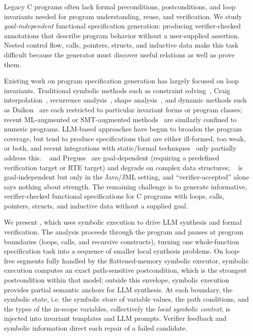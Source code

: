 

Legacy C programs often lack formal preconditions, postconditions, and loop invariants needed for program understanding, reuse, and verification. We study \emph{goal-independent} functional specification generation: producing verifier-checked annotations that describe program behavior without a user-supplied assertion. Nested control flow, calls, pointers, structs, and inductive data make this task difficult because the generator must discover useful relations as well as prove them.

Existing work on program specification generation has largely focused on loop invariants. Traditional symbolic methods such as constraint solving~\cite{DBLP:conf/cav/ColonSS03,DBLP:journals/pacmpl/LiuFYSL22}, Craig interpolation~\cite{FiB_Squeezing_loop,DBLP:conf/cade/GanDXZKC16,Nonlinear_Craig_Interpolant_Generation}, recurrence analysis~\cite{beyer2024decomposing,wonisch2012predicate}, shape analysis~\cite{calcagno2009compositional}, and dynamic methods such as Daikon~\cite{Daikon} are each restricted to particular invariant forms or program classes; recent ML-augmented or SMT-augmented methods~\cite{Code2Inv_a_Deep_Learning_Framework_for_Program_Verification,Loop_Invariant_Inference_through_SMT_Solving_Enhanced_Reinforcement_Learning,DBLP:journals/pacmse/CaoWXYWCM25} are similarly confined to numeric programs. LLM-based approaches have begun to broaden the program coverage, but tend to produce specifications that are either ill-formed, too weak, or both, and recent integrations with static/formal techniques~\cite{autospec,Enhancing_Automated_Loop_Invariant_Generation_for_Complex_Programs_with_Large_Language_Models,SpecGen,Wang2025ATO} only partially address this. \autospec~\cite{autospec} and Preguss~\cite{Wang2025ATO} are goal-dependent (requiring a predefined verification target or RTE target) and degrade on complex data structures; \specgen~\cite{SpecGen} is goal-independent but only in the Java/JML setting, and ``verifier-accepted'' alone says nothing about strength. The remaining challenge is to generate informative, verifier-checked functional specifications for C programs with loops, calls, pointers, structs, and inductive data without a supplied goal.


We present \toolname, which uses symbolic execution to drive LLM synthesis and formal verification. The analysis proceeds through the program and pauses at program boundaries (loops, calls, and recursive constructs), turning one whole-function specification task into a sequence of smaller local synthesis problems. On loop-free segments fully handled by the flattened-memory symbolic executor, symbolic execution computes an exact path-sensitive postcondition, which is the strongest postcondition within that model; outside this envelope, symbolic execution provides partial semantic anchors for LLM synthesis. At each boundary, the symbolic state, i.e. the symbolic store of variable values, the path conditions, and the types of the in-scope variables, collectively the \emph{local symbolic context}, is injected into invariant templates and LLM prompts. Verifier feedback and symbolic information direct each repair of a failed candidate.

